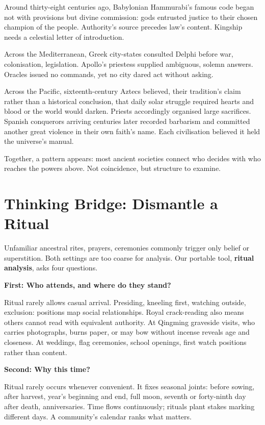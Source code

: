 Around thirty-eight centuries ago, Babylonian Hammurabi's famous code began not with provisions but divine commission: gods entrusted justice to their chosen champion of the people. Authority's source precedes law's content. Kingship needs a celestial letter of introduction.

Across the Mediterranean, Greek city-states consulted Delphi before war, colonisation, legislation. Apollo's priestess supplied ambiguous, solemn answers. Oracles issued no commands, yet no city dared act without asking.

Across the Pacific, sixteenth-century Aztecs believed, their tradition's claim rather than a historical conclusion, that daily solar struggle required hearts and blood or the world would darken. Priests accordingly organised large sacrifices. Spanish conquerors arriving centuries later recorded barbarism and committed another great violence in their own faith's name. Each civilisation believed it held the universe's manual.

Together, a pattern appears: most ancient societies connect who decides with who reaches the powers above. Not coincidence, but structure to examine.

\section{Thinking Bridge: Dismantle a Ritual}
Unfamiliar ancestral rites, prayers, ceremonies commonly trigger only belief or superstition. Both settings are too coarse for analysis. Our portable tool, \textbf{ritual analysis}, asks four questions.

\textbf{First: Who attends, and where do they stand?}

Ritual rarely allows casual arrival. Presiding, kneeling first, watching outside, exclusion: positions map social relationships. Royal crack-reading also means others cannot read with equivalent authority. At Qingming graveside visits, who carries photographs, burns paper, or may bow without incense reveals age and closeness. At weddings, flag ceremonies, school openings, first watch positions rather than content.

\textbf{Second: Why this time?}

Ritual rarely occurs whenever convenient. It fixes seasonal joints: before sowing, after harvest, year's beginning and end, full moon, seventh or forty-ninth day after death, anniversaries. Time flows continuously; rituals plant stakes marking different days. A community's calendar ranks what matters.

